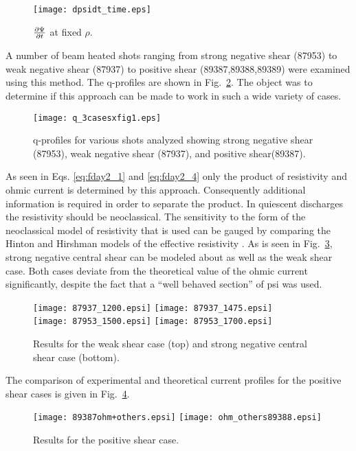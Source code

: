 \begin{figure}
 \centering
 \texttt{[image: dpsidt\_time.eps]}
 \caption{$\frac{\partial{ \Psi}}{\partial{ t}}$ at fixed $\rho$.\label{fig:TDEMdpsidt}}
\end{figure}

A number of beam heated shots ranging from strong negative shear (87953) to
weak negative shear (87937) to positive shear (89387,89388,89389) were examined
using this method.  The q-profiles are shown in Fig.~\ref{fig:TDEMq}.  The
object was to determine if this approach can be made to work in such a wide
variety of cases.
\begin{figure}
 \centering
 \texttt{[image: q\_3casesxfig1.eps]}
 \caption{q-profiles for various shots analyzed showing strong negative shear
 (87953), weak negative shear (87937), and positive
 shear(89387).\label{fig:TDEMq}}
\end{figure}

As seen in Eqs. \eqref{eq:fday2_1} and \eqref{eq:fday2_4} only the product of
resistivity and ohmic current is determined by this approach. Consequently
additional information is required in order to  separate the product. In
quiescent discharges the resistivity should be neoclassical. The sensitivity  to
the form of the neoclassical model of resistivity that is used can be gauged by
comparing the Hinton and Hirshman models of the effective resistivity . As is
seen in Fig.~\ref{fig:TDEMweakstrong}, strong negative
central shear can be modeled about as well as the weak shear case. Both cases
deviate from the theoretical value of the ohmic current significantly, despite
the fact that a ``well behaved section'' of psi was used. 
\begin{figure}
 \centering
 \texttt{[image: 87937\_1200.epsi]}
 \texttt{[image: 87937\_1475.epsi]}\\
 \texttt{[image: 87953\_1500.epsi]}
 \texttt{[image: 87953\_1700.epsi]}
 \caption{Results for the weak shear case (top) and strong negative central
  shear case (bottom). \label{fig:TDEMweakstrong}}
\end{figure}

The comparison of experimental and theoretical current profiles for the positive shear cases is given in Fig.~\ref{fig:TDEMpositive}.
\begin{figure}
 \centering
 \texttt{[image: 89387ohm+others.epsi]}
 \texttt{[image: ohm\_others89388.epsi]}
 \caption{Results for the positive shear case.\label{fig:TDEMpositive}}
\end{figure}

